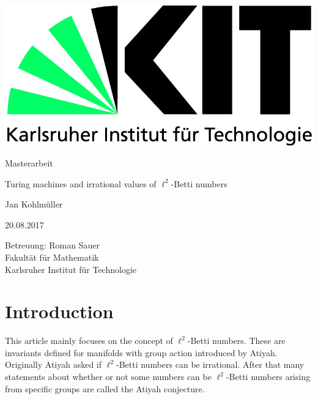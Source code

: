 \documentclass[12pt,a4paper]{scrartcl}
\theoremstyle{plain}
\theoremstyle{definition}
\newcommand{\2}{\mathbb{Z} / 2 \mathbb{Z}}
\newcommand{\1}{\bar{1}}
\newcommand{\0}{\bar{0}}
\begin{document}
  \pagestyle{empty}

  \begin{titlepage}

    \includegraphics[scale=0.45]{kit-logo.jpg} 
    \vspace*{2cm} 

 \begin{center} \large 
    
    Masterarbeit
    \vspace*{2cm}

    {\huge Turing machines and irrational values of $\ell^2$-Betti numbers}
    \vspace*{2.5cm}

    Jan Kohlmüller
    \vspace*{1.5cm}

    20.08.2017
    \vspace*{4cm}


    Betreuung: Roman Sauer \\[1cm]
    Fakultät für Mathematik \\[1cm]
		Karlsruher Institut für Technologie
  \end{center}
\end{titlepage}



  \tableofcontents

\newpage
 


  \pagestyle{headings}

\section{Introduction} 
This article mainly focuses on the concept of $\ell^2$-Betti numbers. These are invariants defined for manifolds with group action introduced by Atiyah. Originally Atiyah asked if $\ell^2$-Betti numbers can be irrational. After that many statements about whether or not some numbers can be $\ell^2$-Betti numbers arising from specific groups are called the Atiyah conjecture.
\end{document}
